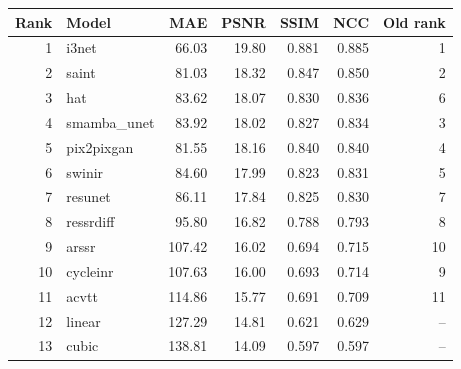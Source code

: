 \begin{tabular}{r l r r r r r}
\toprule
Rank & Model & MAE & PSNR & SSIM & NCC & Old rank \\
\midrule
1 & i3net & 66.03 & 19.80 & 0.881 & 0.885 & 1 \\
2 & saint & 81.03 & 18.32 & 0.847 & 0.850 & 2 \\
3 & hat & 83.62 & 18.07 & 0.830 & 0.836 & 6 \\
4 & smamba\_unet & 83.92 & 18.02 & 0.827 & 0.834 & 3 \\
5 & pix2pixgan & 81.55 & 18.16 & 0.840 & 0.840 & 4 \\
6 & swinir & 84.60 & 17.99 & 0.823 & 0.831 & 5 \\
7 & resunet & 86.11 & 17.84 & 0.825 & 0.830 & 7 \\
8 & ressrdiff & 95.80 & 16.82 & 0.788 & 0.793 & 8 \\
9 & arssr & 107.42 & 16.02 & 0.694 & 0.715 & 10 \\
10 & cycleinr & 107.63 & 16.00 & 0.693 & 0.714 & 9 \\
11 & acvtt & 114.86 & 15.77 & 0.691 & 0.709 & 11 \\
12 & linear & 127.29 & 14.81 & 0.621 & 0.629 & -- \\
13 & cubic & 138.81 & 14.09 & 0.597 & 0.597 & -- \\
\bottomrule
\end{tabular}
